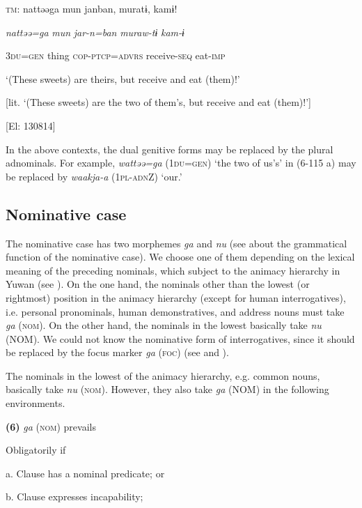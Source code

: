     \textsc{tm}:  nattəəga  mun  janban,  muratɨ,  kamɨ!

      \textit{nattəə=ga}  \textit{mun}  \textit{jar-n=ban}  \textit{muraw-tɨ}  \textit{kam-ɨ}

      3\textsc{du}=\textsc{gen}  thing  \textsc{cop}-\textsc{ptcp}=\textsc{advrs}  receive-\textsc{seq}  eat-\textsc{imp}

      ‘(These sweets) are theirs, but receive and eat (them)!’

[lit. ‘(These sweets) are the two of them’s, but receive and eat (them)!’]

      [El: 130814]

In the above contexts, the dual genitive forms may be replaced by the plural adnominals. For example, \textit{wattəə=ga} (1\textsc{du}=\textsc{gen}) ‘the two of us’s’ in (6-115 a) may be replaced by \textit{waakja-a} (1\textsc{pl}-\textsc{adn}Z) ‘our.’

\subsection{Nominative case}

The nominative case has two morphemes \textit{ga} and \textit{nu} (see  about the grammatical function of the nominative case). We choose one of them depending on the lexical meaning of the preceding nominals, which subject to the animacy hierarchy in Yuwan (see ). On the one hand, the nominals other than the lowest (or rightmost) position in the animacy hierarchy (except for human interrogatives), i.e. personal pronominals, human demonstratives, and address nouns must take \textit{ga} (\textsc{nom}). On the other hand, the nominals in the lowest basically take \textit{nu} (NOM). We could not know the nominative form of interrogatives, since it should be replaced by the focus marker \textit{ga} (\textsc{foc}) (see  and ).

The nominals in the lowest of the animacy hierarchy, e.g. common nouns, basically take \textit{nu} (\textsc{nom}). However, they also take \textit{ga} (NOM) in the following environments.

\textbf{(6)}  \textit{ga} (\textsc{nom}) prevails

  Obligatorily if

  a.  Clause has a nominal predicate; or

  b.  Clause expresses incapability;

